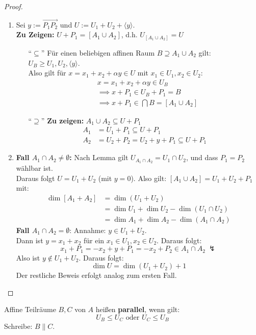 \documentclass[parskip,a4paper,twoside,DIV15,BCOR12mm]{scrbook}
\begin{document}
\begin{proof}
\begin{enumerate}
\item Sei $y:=\overrightarrow{P_1P_2}$ und $U:=U_1+U_2+\langle y\rangle$.\\
\textbf{Zu Zeigen:} $U+P_1=[A_1\cup A_2]$, d.h. $U_{[A_1\cup A_2]}=U$
\begin{enumerate}
\item["`$\subseteq$"'] Für einen beliebigen affinen Raum $B\supseteq A_1\cup A_2$ gilt: $U_B\ge U_1,U_2,
\langle y\rangle$.\\
Also gilt für $x=x_1+x_2+\alpha y\in U$ mit $x_1\in U_1, x_2\in U_2$:
\begin{align*}
&x=x_1+x_2+\alpha y\in U_B\\
&\implies x+P_1\in U_B+P_1=B\\
&\implies x+P_1\in \bigcap B=[A_1\cup A_2]
\end{align*}
\item["`$\supseteq$"'] \textbf{Zu zeigen:} $A_1\cup A_2\subseteq U+P_1$\\
\begin{align*}
A_1&=U_1+P_1\subseteq U+P_1\\
A_2&=U_2+P_2=U_2+y+P_1\subseteq U+P_1
\end{align*}
\end{enumerate}
\item 
\textbf{Fall $A_1\cap A_2\ne\emptyset$:} Nach Lemma gilt $U_{A_1\cap A_2}=U_1\cap U_2$,
und dass $P_1=P_2$ wählbar ist.\\ 
Daraus folgt $U=U_1+U_2$ (mit $y=0$). Also gilt: $[A_1\cup A_2]=U_1+U_2+P_1$ mit:
\begin{align*}
\dim{[A_1+A_2]}&=\dim{(U_1+U_2)}\\
&=\dim{U_1}+\dim{U_2}-\dim{(U_1\cap U_2)}\\
&=\dim{A_1}+\dim{A_2}-\dim{(A_1\cap A_2)}
\end{align*}
\textbf{Fall $A_1\cap A_2=\emptyset$}: Annahme: $y\in U_1+U_2$.\\
Dann ist $y=x_1+x_2$ für ein $x_1\in U_1,x_2\in U_2$. Daraus folgt:
\[x_1+P_1 = -x_2+y+P_1=-x_2+P_2\in A_1\cap A_2\ \lightning\]
Also ist $y\notin U_1+U_2$. Daraus folgt:
\[\dim{U}=\dim{(U_1+U_2)}+1\]
Der restliche Beweis erfolgt analog zum ersten Fall.
\end{enumerate}
\end{proof}

\begin{definition}
Affine Teilräume $B,C$ von $A$ heißen \textbf{parallel}, wenn gilt:
\[U_B\le U_C \text{ oder }U_C\le U_B\]
Schreibe: $B\parallel C$.
\end{definition}
\end{document}
